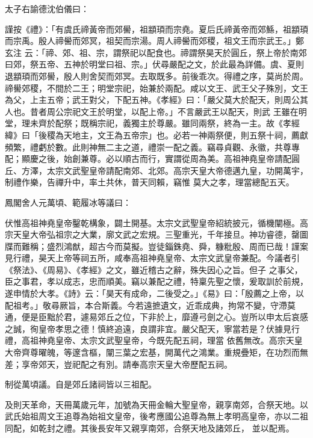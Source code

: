 \begin{pinyinscope}
 太子右諭德沈伯儀曰：



 謹按《禮》：「有虞氏禘黃帝而郊嚳，祖顓頊而宗堯。夏后氏禘黃帝而郊鯀，祖顓頊而宗禹。殷人禘嚳而郊冥，祖契而宗湯。周人禘嚳而郊稷，祖文王而宗武王。」鄭玄注
 云：「禘、郊、祖、宗，謂祭祀以配食也。禘謂祭昊天於圓丘，祭上帝於南郊曰郊，祭五帝、五神於明堂曰祖、宗。」伏尋嚴配之文，於此最為詳備。虞、夏則退顓頊而郊嚳，殷人則舍契而郊冥。去取既多。前後乖次。得禮之序，莫尚於周。禘嚳郊稷，不間於二王；明堂宗祀，始兼於兩配。咸以文王、武王父子殊別，文王為父，上主五帝；武王對父，下配五神。《孝經》曰：「嚴父莫大於配天，則周公其人也。昔者周公宗祀文王於明堂，以配上帝。」不言嚴武王以配天，則武
 王雖在明堂，理未齊於配祭；既稱宗祀，義獨主於尊嚴。雖同兩祭，終為一主。故《孝經緯》曰「後稷為天地主，文王為五帝宗」也。必若一神兩祭便，則五祭十祠，薦獻頻繁，禮虧於數。此則神無二主之道，禮崇一配之義。竊尋貞觀、永徽，共尊專配；顯慶之後，始創兼尊。必以順古而行，實謂從周為美。高祖神堯皇帝請配圓丘、方澤，太宗文武聖皇帝請配南郊、北郊。高宗天皇大帝德邁九皇，功開萬宇，制禮作樂，告禪升中，率土共休，普天同賴，竊惟
 莫大之孝，理當總配五天。



 鳳閣舍人元萬頃、範履冰等議曰：



 伏惟高祖神堯皇帝鑿乾構象，闢土開基。太宗文武聖皇帝紹統披元，循機闡極。高宗天皇大帝弘祖宗之大業，廓文武之宏規。三聖重光，千年接旦。神功睿德，罄圖牒而難稱；盛烈鴻猷，超古今而莫擬。豈徒錙銖堯、舜，糠粃殷、周而已哉！謹案見行禮，昊天上帝等祠五所，咸奉高祖神堯皇帝、太宗文武皇帝兼配。今議者引《祭法》、《周易》、《孝經》之文，雖近稽古之辭，殊失因心之旨。但子
 之事父，臣之事君，孝以成志，忠而順美。竊以兼配之禮，特稟先聖之懷，爰取訓於前規，遂申情於大孝。《詩》云：「昊天有成命，二後受之。」《易》曰：「殷薦之上帝，以配祖考。」敬尋厥旨，本合斯義。今若遠摭遺文，近乖成典，拘常不變，守滯莫通，便是臣黜於君，遽易郊丘之位，下非於上，靡遵弓劍之心。豈所以申太后哀感之誠，徇皇帝孝思之德！慎終追遠，良謂非宜。嚴父配天，寧當若是？伏據見行禮，高祖神堯皇帝、太宗文武聖皇帝，今既先配五祠，理當
 依舊無改。高宗天皇大帝齊尊曜魄，等邃含樞，闡三葉之宏基，開萬代之鴻業。重規疊矩，在功烈而無差；享帝郊天，豈祀配之有別。請奉高宗天皇大帝歷配五祠。



 制從萬頃議。自是郊丘諸祠皆以三祖配。



 及則天革命，天冊萬歲元年，加號為天冊金輪大聖皇帝，親享南郊，合祭天地。以武氏始祖周文王追尊為始祖文皇帝，後考應國公追尊為無上孝明高皇帝，亦以二祖同配，如乾封之禮。其後長安年又親享南郊，合祭天地及諸郊丘，
 並以配焉。




\end{pinyinscope}
